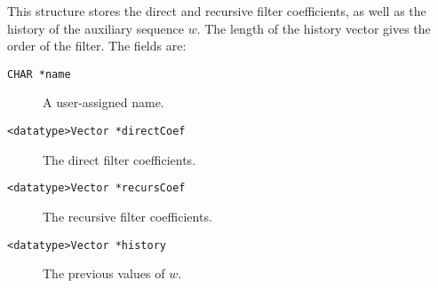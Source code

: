 \noindent This structure stores the direct and recursive filter
coefficients, as well as the history of the auxiliary sequence $w$.
The length of the history vector gives the order of the filter.  The
fields are:

\begin{description}
\item[\texttt{CHAR *name}] A user-assigned name.

\item[\texttt{<datatype>Vector *directCoef}] The direct filter
  coefficients.

\item[\texttt{<datatype>Vector *recursCoef}] The recursive filter
  coefficients.

\item[\texttt{<datatype>Vector *history}] The previous values of $w$.
\end{description}

\newpage
\newpage
\newpage
\newpage
\newpage

